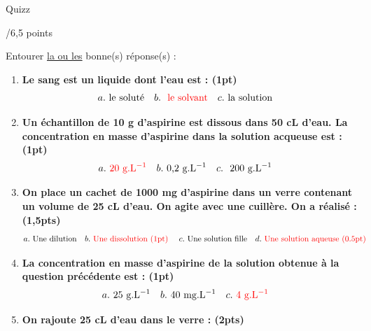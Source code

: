 \begin{doc}{Quizz \begin{large}
    /6,5 points
\end{large}}
Entourer \underline{la ou les} bonne(s) réponse(s) :
\begin{enumerate}
    \item \textbf{Le sang est un liquide dont l'eau est : (1pt)}
        \begin{align*}
            a.& ~\text{le soluté} & b.& ~\text{ \textcolor{red}{le solvant}} & c.& ~\text{la solution}
        \end{align*}
    \item \textbf{Un échantillon de 10 g d’aspirine est dissous dans 50 cL d’eau. La concentration
en masse d’aspirine dans la solution acqueuse est : (1pt)}
        \begin{align*}
            a.& \text{ \textcolor{red}{20 g.L$^{-1}$}} & b.& \text{ 0,2 g.L$^{-1}$} & c.& ~\text{ 200 g.L$^{-1}$}
        \end{align*}
    \item \textbf{On place un cachet de 1000 mg d'aspirine dans un verre contenant un volume de 25 cL d'eau. On agite avec une cuillère. On a réalisé : (1,5pts) }
        \begin{align*}
            a.& ~\text{Une dilution} & b.& ~\text{\textcolor{red}{Une dissolution (1pt)} } & c.& ~\text{Une solution fille} & d.& ~\text{\textcolor{red}{Une solution aqueuse (0.5pt)}} 
        \end{align*}
    \item \textbf{La concentration en masse d'aspirine de la solution obtenue à la question précédente est : (1pt)}
        \begin{align*}
            a.& ~\text{25 g.L$^{-1}$} & b.& ~\text{40 mg.L$^{-1}$} & c.& ~\text{\textcolor{red}{4 g.L$^{-1}$}}
        \end{align*}
    \item \textbf{On rajoute 25 cL d'eau dans le verre : (2pts)}

\end{enumerate}
\end{doc}
